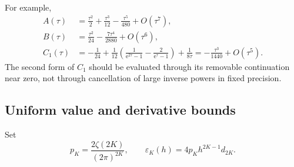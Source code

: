 \documentclass[11pt,a4paper]{article}
\numberwithin{equation}{section}
\theoremstyle{definition}
\newcommand{\ee}{\mathrm e}
\newcommand{\eps}{\varepsilon}
\begin{document}
For example,
\begin{align}
A(\tau)&=\frac{\tau^2}{2}+\frac{\tau^3}{12}
                          -\frac{\tau^5}{480}+O(\tau^7),\label{eq:Asmall}\\
B(\tau)&=\frac{\tau^2}{24}-\frac{7\tau^4}{2880}+O(\tau^6),\label{eq:Bsmall}\\
C_1(\tau)&=-\frac1{24}+\frac1{12}
 \left(\frac1{\ee^{2\tau}-1}-\frac2{\ee^\tau-1}\right)+\frac1{8\tau}
 =-\frac{\tau^3}{1440}+O(\tau^5).
\label{eq:C1}
\end{align}
The second form of $C_1$ should be evaluated through its removable continuation near zero, not through cancellation of large inverse powers in fixed precision.

\subsection{Uniform value and derivative bounds}
Set
\begin{equation}
p_K=\frac{2\zeta(2K)}{(2\pi)^{2K}},\qquad
\eps_K(h)=4p_Kh^{2K-1}d_{2K}.
\label{eq:epsilon}
\end{equation}
\end{document}
